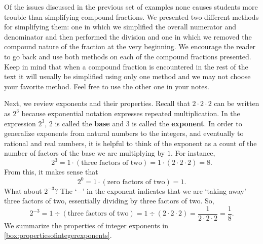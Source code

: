 Of the issues discussed in the previous set of examples none causes students more trouble than simplifying compound fractions.  We presented two different methods for simplifying them:  one in which we simplified the overall numerator and denominator and then performed the division and one in which we removed the compound nature of the fraction at the very beginning.   We encourage the reader to go back and use both methods on each of the compound fractions presented.  Keep in mind that when a compound fraction is encountered in the rest of the text it will usually be simplified using only one method and we may not choose your favorite method.  Feel free to use the other one in your notes.

\smallskip

Next, we review exponents and their properties.  Recall that $2 \cdot 2 \cdot 2$  can be written as $2^3$ because exponential notation expresses repeated multiplication.  In the expression $2^3$, $2$ is called the \textbf{base} and $3$ is called the \textbf{exponent}. In order to generalize exponents from natural numbers to the integers, and eventually to rational and real numbers, it is helpful to think of the exponent as a count of the number of factors of the base we are multiplying by $1$.  For instance, \[2^3 = 1 \cdot (\text{three factors of two}) = 1 \cdot (2 \cdot 2 \cdot 2) = 8.\] From this, it makes sense that \[2^{0} = 1 \cdot (\text{zero factors of two}) = 1.\]  What about $2^{-3}$?  The `$-$' in the exponent indicates that we are `taking away' three factors of two, essentially dividing by three factors of two.  So, \[2^{-3} = 1 \div (\text{three factors of two}) = 1 \div (2 \cdot 2 \cdot 2) = \frac{1}{2 \cdot 2 \cdot 2} = \frac{1}{8}.\]  We summarize the properties of integer exponents in \autoref{box:propertiesofintegerexponents}.

